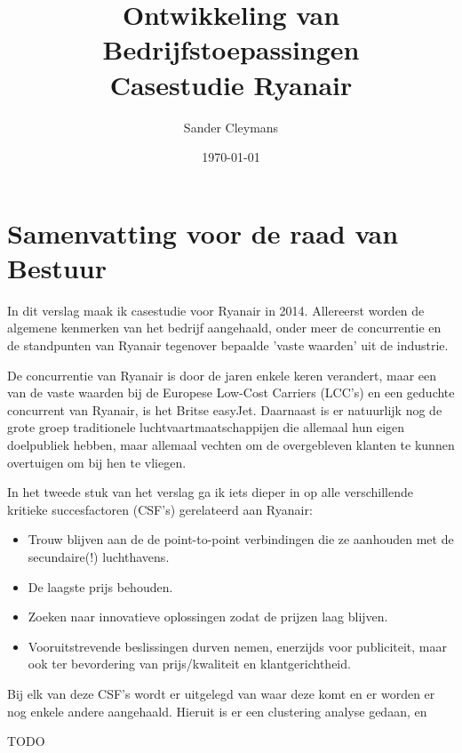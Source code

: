 \documentclass{article}
\author{Sander Cleymans}
\date{\today}
\title{Ontwikkeling van Bedrijfstoepassingen \\
		Casestudie Ryanair}
\begin{document}
 

\maketitle

\newpage  

\tableofcontents

\newpage
\part{Samenvatting voor de raad van Bestuur}

In dit verslag maak ik casestudie voor Ryanair in 2014.
Allereerst worden de algemene kenmerken van het bedrijf aangehaald, onder meer de concurrentie en de standpunten van Ryanair tegenover bepaalde 'vaste waarden' uit de industrie.
   
De concurrentie van Ryanair is door de jaren enkele keren verandert, maar een van de vaste waarden bij de Europese Low-Cost Carriers (LCC's) en een geduchte concurrent van Ryanair, is het Britse easyJet. Daarnaast is er natuurlijk nog de grote groep traditionele luchtvaartmaatschappijen die allemaal hun eigen doelpubliek hebben, maar allemaal vechten om de overgebleven klanten te kunnen overtuigen om bij hen te vliegen.
	
In het tweede stuk van het verslag ga ik iets dieper in op alle verschillende kritieke succesfactoren (CSF's) gerelateerd aan Ryanair:

\begin{itemize}
\item Trouw blijven aan de de point-to-point verbindingen die ze aanhouden met de secundaire(!) luchthavens.
\item De laagste prijs behouden.
\item Zoeken naar innovatieve oplossingen zodat de prijzen laag blijven.
\item Vooruitstrevende beslissingen durven nemen, enerzijds voor publiciteit, maar ook ter bevordering van prijs/kwaliteit en klantgerichtheid.
\end{itemize}

Bij elk van deze CSF's wordt er uitgelegd van waar deze komt en er worden er nog enkele andere aangehaald.
Hieruit is er een clustering analyse gedaan, en 

\begin{center}
\begin{Huge}
TODO
\end{Huge}
\end{center} 
\end{document}
